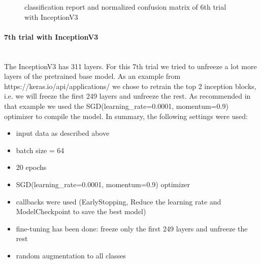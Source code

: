 \documentclass{article}
\begin{document}
\begin{figure}%
  \centering
  \qquad
  \caption{classification report and normalized confusion matrix of 6th trial with InceptionV3}
  \label{fig:inceptionv3_09_results}
\end{figure}
\newpage
\paragraph{7th trial with InceptionV3}\mbox{}\\

The InceptionV3 has 311 layers. For this 7th trial we tried to unfreeze a lot more layers of the pretrained base model. As an example from https://keras.io/api/applications/ we chose to retrain the top 2 inception blocks, i.e. we will freeze the first 249 layers and unfreeze the rest. As recommended in that example we used the SGD(learning\_rate=0.0001, momentum=0.9) optimizer to compile the model. In summary, the following settings were used: 
\begin{itemize}
\item input data as described above
\item batch size = 64
\item 20 epochs 
\item SGD(learning\_rate=0.0001, momentum=0.9) optimizer
\item callbacks were used (EarlyStopping, Reduce the learning rate and ModelCheckpoint to save the best model)
\item fine-tuning has been done: freeze only the first 249 layers and unfreeze the rest
\item random augmentation to all classes 
\end{itemize}
\end{document}
